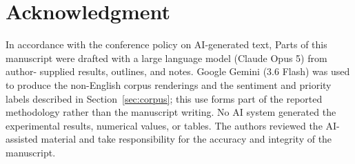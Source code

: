 %
%

\section*{Acknowledgment}
In accordance with the conference policy on AI-generated
text, Parts of this manuscript were drafted with a large language
model (Claude Opus 5) from author-
supplied results, outlines, and notes. Google Gemini (3.6
Flash) was used to produce the non-English corpus renderings
and the sentiment and priority labels described in Section~\ref{sec:corpus};
this use forms part of the reported methodology rather than the
manuscript writing. No AI system generated the experimental
results, numerical values, or tables. The authors reviewed the
AI-assisted material and take responsibility for the accuracy
and integrity of the manuscript.
